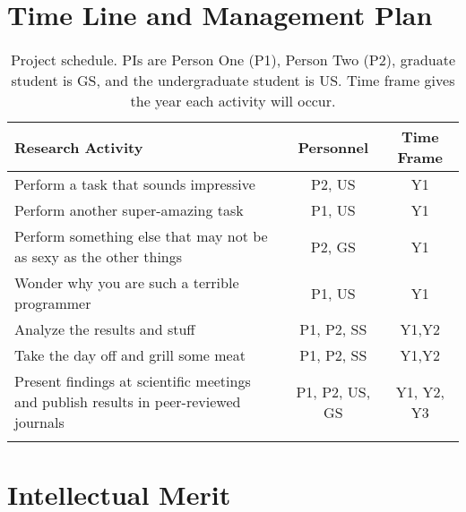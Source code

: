 \section{Time Line and Management Plan}

\begin{table}[H]
\renewcommand{\arraystretch}{0}
\caption{Project schedule.  PIs are Person One (P1), Person Two (P2), graduate student is GS, and the undergraduate student is US. Time frame gives the year each activity will occur.}
\scriptsize
\begin{tabularx}{\textwidth}{Y c c }
\hline
\hline
\textbf{Research Activity} & \textbf{Personnel} & \textbf{Time Frame}\\
\hline
Perform a task that sounds impressive & P2, US & Y1 \T\\
Perform another super-amazing task & P1, US & Y1 \T\\
Perform something else that may not be as sexy as the other things & P2, GS & Y1 \T\\
Wonder why you are such a terrible programmer & P1, US & Y1 \T\\
Analyze the results and stuff & P1, P2, SS & Y1,Y2 \T\\
Take the day off and grill some meat & P1, P2, SS & Y1,Y2 \T\\
Present findings at scientific meetings and publish results in peer-reviewed journals & P1, P2, US, GS & Y1, Y2, Y3\T\B\\
\hline
\hline
\label{table1}
\end{tabularx}
\end{table}


\section{Intellectual Merit}

